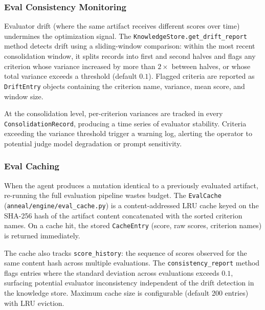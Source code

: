 \subsubsection{Eval Consistency Monitoring}\label{sec:drift-detection}

Evaluator drift (where the same artifact receives different scores over time) undermines the optimization signal.
The \texttt{KnowledgeStore.get\_drift\_report} method detects drift using a sliding-window comparison: within the most recent consolidation window, it splits records into first and second halves and flags any criterion whose variance increased by more than $2\times$ between halves, or whose total variance exceeds a threshold (default $0.1$).
Flagged criteria are reported as \texttt{DriftEntry} objects containing the criterion name, variance, mean score, and window size.

At the consolidation level, per-criterion variances are tracked in every \texttt{ConsolidationRecord}, producing a time series of evaluator stability.
Criteria exceeding the variance threshold trigger a warning log, alerting the operator to potential judge model degradation or prompt sensitivity.

\subsubsection{Eval Caching}\label{sec:eval-cache}

When the agent produces a mutation identical to a previously evaluated artifact, re-running the full evaluation pipeline wastes budget.
The \texttt{EvalCache} (\texttt{anneal/engine/eval\_cache.py}) is a content-addressed LRU cache keyed on the SHA-256 hash of the artifact content concatenated with the sorted criterion names.
On a cache hit, the stored \texttt{CacheEntry} (score, raw scores, criterion names) is returned immediately.

The cache also tracks \texttt{score\_history}: the sequence of scores observed for the same content hash across multiple evaluations.
The \texttt{consistency\_report} method flags entries where the standard deviation across evaluations exceeds $0.1$, surfacing potential evaluator inconsistency independent of the drift detection in the knowledge store.
Maximum cache size is configurable (default 200 entries) with LRU eviction.

